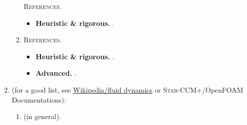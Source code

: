 \documentclass{book}
\numberwithin{equation}{section}
\begin{document}
\begin{enumerate}
\begin{enumerate}
        \textsc{References.}
        \begin{itemize}
            \item \textbf{Heuristic \& rigorous.} \cite[Chap. 10: Hamilton-Jacobi Equations]{Evans2010}.
        \end{itemize}
        \item {}
        
        \textsc{References.}
        \begin{itemize}
            \item \textbf{Heuristic \& rigorous.} \cite[Chap. 12: Nonlinear Wave Equations]{Evans2010}.
            \item \textbf{Advanced.} \cite{Lannes2013}.
        \end{itemize}
    \end{enumerate}
    \item {}
    
    (for a good list, see \href{https://en.wikipedia.org/wiki/Fluid_dynamics}{Wikipedia/fluid dynamics} or \textsc{Star-CCM+}/OpenFOAM Documentations):
    \begin{enumerate}
        \item {} (in general).
        

\end{enumerate}
\end{enumerate}
\end{document}
